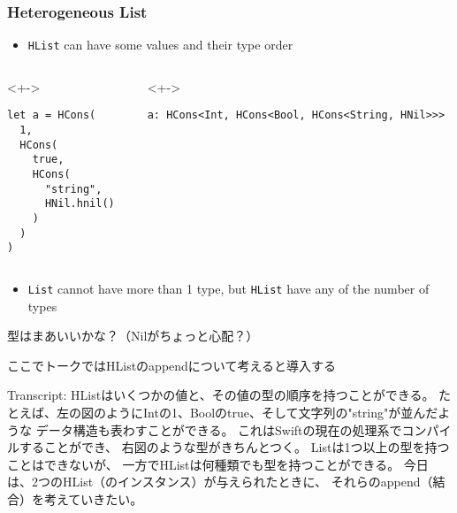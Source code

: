 \begin{frame}[fragile]
  \frametitle{Heterogeneous List}

  \begin{itemize}
    \item<+-> \lstinline|HList| can have some values
    and their type order
  \end{itemize}

  \begin{columns}
    \begin{column}{0.3\textwidth}
      \begin{uncoverenv}<+->
\begin{lstlisting}[style=swift]
let a = HCons(
  1,
  HCons(
    true,
    HCons(
      "string",
      HNil.hnil() 
    )
  )
)
\end{lstlisting}
      \end{uncoverenv}
    \end{column}
    \begin{column}{0.7\textwidth}
      \begin{uncoverenv}<+->
\begin{lstlisting}[style=swift]
a: HCons<Int, HCons<Bool, HCons<String, HNil>>>
\end{lstlisting}
      \end{uncoverenv}
    \end{column}
  \end{columns}

  \begin{itemize}
    \item<+-> \lstinline|List| cannot have more than 1 type, but \lstinline|HList| have any of the number of types
  \end{itemize}


  \begin{notes}
    \item 型はまあいいかな？（Nilがちょっと心配？）

    \item ここでトークではHListのappendについて考えると導入する

    \item Transcript:
    HListはいくつかの値と、その値の型の順序を持つことができる。
    たとえば、左の図のようにIntの1、Boolのtrue、そして文字列の"string"が並んだような
    データ構造も表わすことができる。
    これはSwiftの現在の処理系でコンパイルすることができ、
    右図のような型がきちんとつく。
    Listは1つ以上の型を持つことはできないが、
    一方でHListは何種類でも型を持つことができる。
    今日は、2つのHList（のインスタンス）が与えられたときに、
    それらのappend（結合）を考えていきたい。
  \end{notes}
\end{frame}


